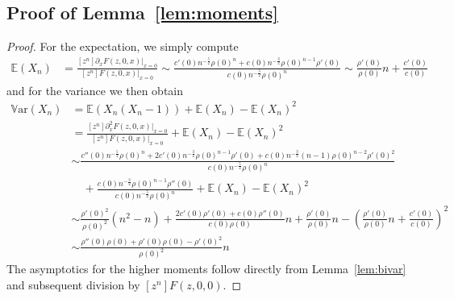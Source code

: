 \documentclass[reqno, 11pt]{amsart}
\theoremstyle{definition}
\theoremstyle{remark}
\newcommand{\E}{\mathbb{E}}
\newcommand{\V}{{\mathbb{V}\mbox{ar}}}
\numberwithin{equation}{section}
\begin{document}
\subsection{Proof of Lemma~\ref{lem:moments}}
\begin{proof}
    For the expectation, we simply compute
    \begin{align*}
        \E(X_n) &= \frac{[z^n]\partial_x F(z,0,x)|_{x=0}}{[z^n]F(z,0,x)|_{x=0}} \sim \frac{c'(0)n^{-\frac{5}{2}}\rho(0)^n+c(0)n^{-\frac{3}{2}}\rho(0)^{n-1}\rho'(0)}{c(0)n^{-\frac{5}{2}}\rho(0)^n}\sim \frac{\rho'(0)}{\rho(0)}n + \frac{c'(0)}{c(0)}
    \end{align*}
    and for the variance we then obtain
    \begin{align*}
        \V(X_n) &= \E(X_n(X_n-1)) + \E(X_n) - \E(X_n)^2\\
        &= \frac{[z^n]\partial_{x}^2 F(z,0,x)|_{x=0}}{[z^n]F(z,0,x)|_{x=0}} + \E(X_n) - \E(X_n)^2\\
        &\sim \frac{c''(0)n^{-\frac{5}{2}}\rho(0)^n+2c'(0)n^{-\frac{3}{2}}\rho(0)^{n-1}\rho'(0)+c(0)n^{-\frac{3}{2}}(n-1)\rho(0)^{n-2}\rho'(0)^2}{c(0)n^{-\frac{5}{2}}\rho(0)^n}\\
        &\quad +\frac{c(0)n^{-\frac{3}{2}}\rho(0)^{n-1}\rho''(0)}{c(0)n^{-\frac{5}{2}}\rho(0)^n}+ \E(X_n) - \E(X_n)^2\\
        &\sim \frac{\rho'(0)^2}{\rho(0)^2}(n^2-n) + \frac{2c'(0)\rho'(0)+c(0)\rho''(0)}{c(0)\rho(0)}n + \frac{\rho'(0)}{\rho(0)}n - \left(\frac{\rho'(0)}{\rho(0)}n + \frac{c'(0)}{c(0)}\right)^2\\
        &\sim \frac{\rho''(0)\rho(0)+\rho'(0)\rho(0)-\rho'(0)^2}{\rho(0)^2}n
    \end{align*}
    The asymptotics for the higher moments follow directly from Lemma~\ref{lem:bivar} and subsequent division by $[z^n] F(z,0,0)$.
\end{proof}
\end{document}
